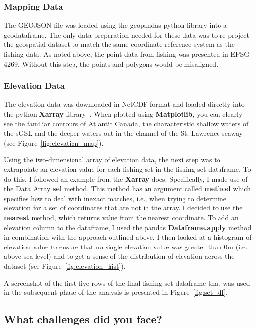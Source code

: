 \subsubsection{Mapping Data}

The GEOJSON file was loaded using the geopandas python library into a geodataframe.
The only data preparation needed for these data was to re-project the geospatial dataset to match the same coordinate reference system as the fishing data.
As noted above, the point data from fishing was presented in EPSG 4269.
Without this step, the points and polygons would be misaligned.

\subsubsection{Elevation Data}

The elevation data was downloaded in NetCDF format and loaded directly into the python \textbf{Xarray} library~\cite{xarray}.
When plotted using \textbf{Matplotlib}, you can clearly see the familiar contours of Atlantic Canada, the characteristic
shallow waters of the sGSL and the deeper waters out in the channel of the St. Lawrence seaway (see Figure~\ref{fig:elevation_map}).

Using the two-dimensional array of elevation data, the next step was to extrapolate an elevation value for each fishing set in the fishing set dataframe.
To do this, I followed an example from the \textbf{Xarray} docs.
Specifically, I made use of the Data Array \textbf{sel} method.
This method has an argument called \textbf{method} which specifies how to deal with inexact matches, i.e.,
when trying to determine elevation for a set of coordinates that are not in the array.
I decided to use the \textbf{nearest} method, which returns value from the nearest coordinate.
To add an elevation column to the dataframe, I used the pandas \textbf{Dataframe.apply} method in combination with the approach outlined above.
I then looked at a histogram of elevation value to ensure that no single elevation value was greater than 0m (i.e. above sea level)
and to get a sense of the distribution of elevation across the dataset (see Figure~\ref{fig:elevation_hist}).

A screenshot of the first five rows of the final fishing set dataframe that was used in the subsequent phase of the analysis is presented in
Figure~\ref{fig:set_df}.

\subsection{What challenges did you face?}


